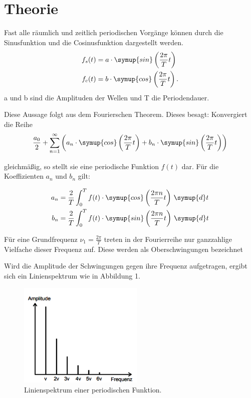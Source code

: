 \section{Theorie}
\label{sec:Theorie}

Fast alle räumlich und zeitlich periodischen Vorgänge können durch die Sinusfunktion
und die Cosinusfunktion dargestellt werden.
\begin{align}
  f_s(t) &= a \cdot \symup{sin}\left(\frac{2\pi}{T}t\right) \\
  f_c(t) &= b \cdot \symup{cos}\left(\frac{2\pi}{T}t\right).
\end{align}
a und b sind die Amplituden der Wellen und T die Periodendauer.

Diese Aussage folgt aus dem Fourierschen Theorem. Dieses besagt: Konvergiert die Reihe
\begin{equation}
  \frac{a_0}{2} + \sum_{n=1}^\infty \left(a_n \cdot \symup{cos}\left(\frac{2\pi}{T}t\right) + b_n \cdot \symup{sin}\left(\frac{2\pi}{T}t\right) \right)
\end{equation}

gleichmäßig, so stellt sie eine periodische Funktion $f(t)$ dar. Für die Koeffizienten $a_n$ und $b_n$ gilt:

\begin{align}
  a_n &= \frac{2}{T} \int_{0}^{T} f(t) \cdot \symup{cos}\left(\frac{2\pi n}{T}t\right) \, \symup{d}t \\
  b_n &= \frac{2}{T} \int_{0}^{T} f(t) \cdot \symup{sin}\left(\frac{2\pi n}{T}t\right) \, \symup{d}t
\end{align}

Für eine Grundfrequenz $\nu_1 = \frac{2\pi}{T}$ treten in der Fourierreihe nur ganzzahlige Vielfache dieser
Frequenz auf. Diese werden als Oberschwingungen bezeichnet

Wird die Amplitude der Schwingungen gegen ihre Frequenz aufgetragen, ergibt sich ein
Linienspektrum wie in Abbildung 1.

\begin{figure}[H]
  \centering
  \includegraphics[height=5cm]{Linienspektrum.PNG}
  \caption{Linienspektrum einer periodischen Funktion. \cite{sample}}
  \label{fig:Linienspektrum}
\end{figure}

